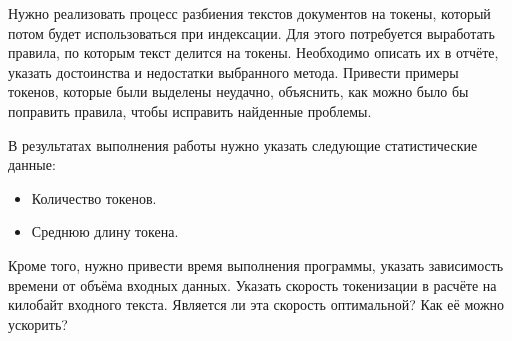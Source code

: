 
Нужно реализовать процесс разбиения текстов документов на токены, который потом будет
использоваться при индексации. Для этого потребуется выработать правила, по которым текст
делится на токены. Необходимо описать их в отчёте, указать достоинства и недостатки 
выбранного метода. Привести примеры токенов, которые были выделены неудачно, объяснить,
как можно было бы поправить правила, чтобы исправить найденные проблемы.

В результатах выполнения работы нужно указать следующие статистические данные:
\begin{itemize}
    \item Количество токенов.
    \item Среднюю длину токена.
\end{itemize}

Кроме того, нужно привести время выполнения программы, указать зависимость времени от
объёма входных данных. Указать скорость токенизации в расчёте на килобайт входного текста.
Является ли эта скорость оптимальной? Как её можно ускорить?

\pagebreak
